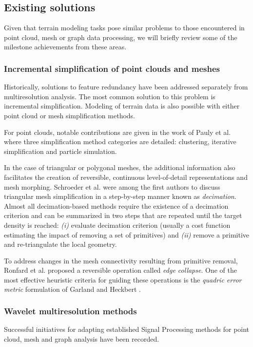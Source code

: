 \documentclass[graybox]{svmult}
\begin{document}
	
	\subsection{Existing solutions}
	Given that terrain modeling tasks pose similar problems to those encountered in point cloud, mesh or graph data processing, we will briefly review some of the milestone achievements from these areas.
	
	\subsubsection{Incremental simplification of point clouds and meshes}
	Historically, solutions to feature redundancy have been addressed separately from multiresolution analysis. The most common solution to this problem is incremental simplification. Modeling of terrain data is also possible with either point cloud or mesh simplification methods.
	
	For point clouds, notable contributions are given in the work of
	Pauly et al.  \cite{Pauly2002} where three simplification method categories are detailed: clustering, iterative simplification and particle simulation.
	
	In the case of triangular or polygonal meshes, the additional information
	also facilitates the creation of reversible, continuous level-of-detail representations and mesh morphing. Schroeder et al. \cite{Schroeder1992} were among the first authors to discuss triangular mesh simplification in a step-by-step manner known as \emph{decimation}. Almost all decimation-based methods require the existence of a decimation criterion and can be summarized in two steps that are repeated until the target density is reached:
	\emph{(i)} evaluate decimation criterion (usually a cost function estimating the impact of removing a set of primitives) and \emph{(ii)} remove a primitive and re-triangulate the local geometry.
	
	To address changes in the mesh connectivity resulting from primitive removal, Ronfard et al. \cite{Ronfard1996} proposed a reversible operation called \emph{edge collapse}. One of the most effective heuristic criteria for guiding these operations is the \emph{quadric error metric} formulation of Garland and Heckbert \cite{Garland1998}.
	
	\subsubsection{Wavelet multiresolution methods}
	Successful initiatives for adapting established Signal Processing methods for
	point cloud, mesh and graph analysis have been recorded. 
	
\end{document}
